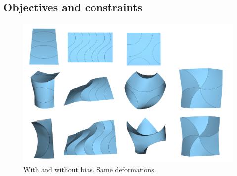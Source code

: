 \subsection{Objectives and constraints} \label{sec:dog_obj}

\begin{figure} [h]
	\centering
	\includegraphics[width=\linewidth]{figures/fold_bias_compare}
	\caption{With and without bias. Same deformations.  }
	\label{fig:fold_bias_compare}
\end{figure}